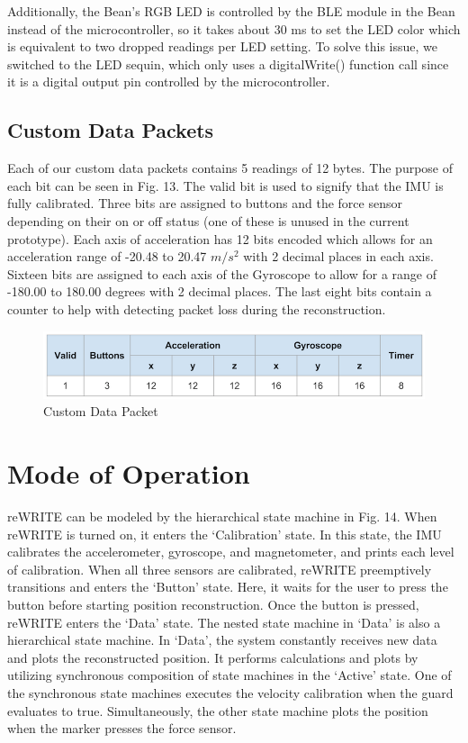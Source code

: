 \documentclass[10pt,journal]{IEEEtran}
\begin{document}
\par Additionally, the Bean's RGB LED is controlled by the BLE module in the Bean instead of the microcontroller, so it takes about 30 ms to set the LED color which is equivalent to two dropped readings per LED setting. To solve this issue, we switched to the LED sequin, which only uses a digitalWrite() function call since it is a digital output pin controlled by the microcontroller. 
  

\subsection{Custom Data Packets}
Each of our custom data packets contains 5 readings of 12 bytes. The purpose of each bit can be seen in Fig. 13. The valid bit is used to signify that the IMU is fully calibrated. Three bits are assigned to buttons and the force sensor depending on their on or off status (one of these is unused in the current prototype). Each axis of acceleration has 12 bits encoded which allows for an acceleration range of -20.48 to 20.47 $m/s^2$ with 2 decimal places in each axis. Sixteen bits are assigned to each axis of the Gyroscope to allow for a range of -180.00 to 180.00 degrees with 2 decimal places. The last eight bits contain a counter to help with detecting packet loss during the reconstruction.

\begin{figure}[h]
  \centering
    \includegraphics[width=\linewidth]{figures/packet}
  		\caption{Custom Data Packet}
  	\label{fig:packet}
\end{figure}

\section{Mode of Operation}
reWRITE can be modeled by the hierarchical state machine in Fig. 14. When reWRITE is turned on, it enters the ‘Calibration' state. In this state, the IMU calibrates the accelerometer, gyroscope, and magnetometer, and prints each level of calibration. When all three sensors are calibrated, reWRITE preemptively transitions and enters the ‘Button' state. Here, it waits for the user to press the button before starting position reconstruction. Once the button is pressed, reWRITE enters the ‘Data' state. The nested state machine in ‘Data' is also a hierarchical state machine. In ‘Data', the system constantly receives new data and plots the reconstructed position. It performs calculations and plots by utilizing synchronous composition of state machines in the ‘Active' state. One of the synchronous state machines executes the velocity calibration when the guard evaluates to true. Simultaneously, the other state machine plots the position when the marker presses the force sensor.
\end{document}
